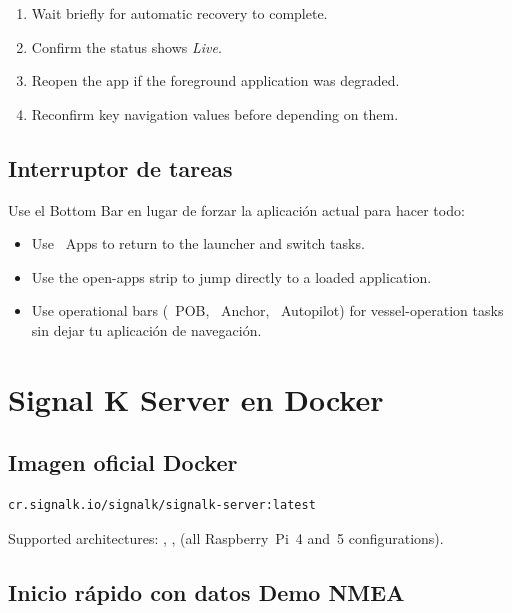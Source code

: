 \begin{enumerate}
  \item Wait briefly for automatic recovery to complete.
  \item Confirm the status shows \textit{Live}.
  \item Reopen the app if the foreground application was degraded.
  \item Reconfirm key navigation values before depending on them.
\end{enumerate}

\section{Interruptor de tareas}

Use el Bottom Bar en lugar de forzar la aplicación actual para hacer todo:

\begin{itemize}
  \item Use ~Apps to return to the launcher and switch tasks.
  \item Use the open-apps strip to jump directly to a loaded application.
  \item Use operational bars (~POB, ~Anchor,
        ~Autopilot) for vessel-operation tasks
sin dejar tu aplicación de navegación.
\end{itemize}

\chapter{Signal K Server en Docker}
\label{ch:docker}

\section{Imagen oficial Docker}

\begin{lstlisting}
cr.signalk.io/signalk/signalk-server:latest
\end{lstlisting}

Supported architectures: , ,
 (all Raspberry~Pi~4 and~5 configurations).

\section{Inicio rápido con datos Demo NMEA}

